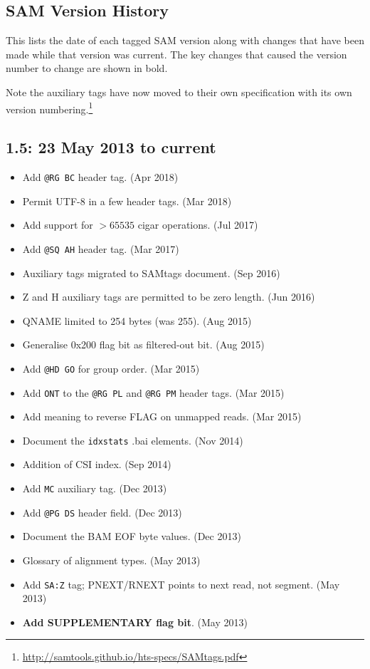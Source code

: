 \documentclass[10pt]{article}
\begin{document}
\begin{appendices}
\appendix
\section{SAM Version History}\label{sec:history}

This lists the date of each tagged SAM version along with changes that
have been made while that version was current.  The key changes
that caused the version number to change are shown in bold.

Note the auxiliary tags have now moved to their own
specification with its own version numbering.\footnote{
\href{http://samtools.github.io/hts-specs/SAMtags.pdf}{http://samtools.github.io/hts-specs/SAMtags.pdf}}

\subsection*{1.5: 23 May 2013 to current}

\begin{itemize}
\item Add {\tt @RG BC} header tag. (Apr 2018)
\item Permit UTF-8 in a few header tags. (Mar 2018)
\item Add support for $>65535$ cigar operations. (Jul 2017)
\item Add {\tt @SQ AH} header tag. (Mar 2017)
\item Auxiliary tags migrated to SAMtags document. (Sep 2016)
\item Z and H auxiliary tags are permitted to be zero length. (Jun 2016)
\item QNAME limited to 254 bytes (was 255). (Aug 2015)
\item Generalise 0x200 flag bit as filtered-out bit. (Aug 2015)
\item Add {\tt @HD GO} for group order. (Mar 2015)
\item Add {\tt ONT} to the {\tt @RG PL} and {\tt @RG PM} header tags. (Mar 2015)
\item Add meaning to reverse FLAG on unmapped reads. (Mar 2015)
\item Document the {\tt idxstats} .bai elements. (Nov 2014)
\item Addition of CSI index. (Sep 2014)
\item Add {\tt MC} auxiliary tag. (Dec 2013)
\item Add {\tt @PG DS} header field. (Dec 2013)
\item Document the BAM EOF byte values. (Dec 2013)
\item Glossary of alignment types. (May 2013)
\item Add {\tt SA:Z} tag; PNEXT/RNEXT points to next read, not
  segment.  (May 2013)
\item \textbf{Add SUPPLEMENTARY flag bit}. (May 2013)
\end{itemize}


\end{appendices}
\end{document}
